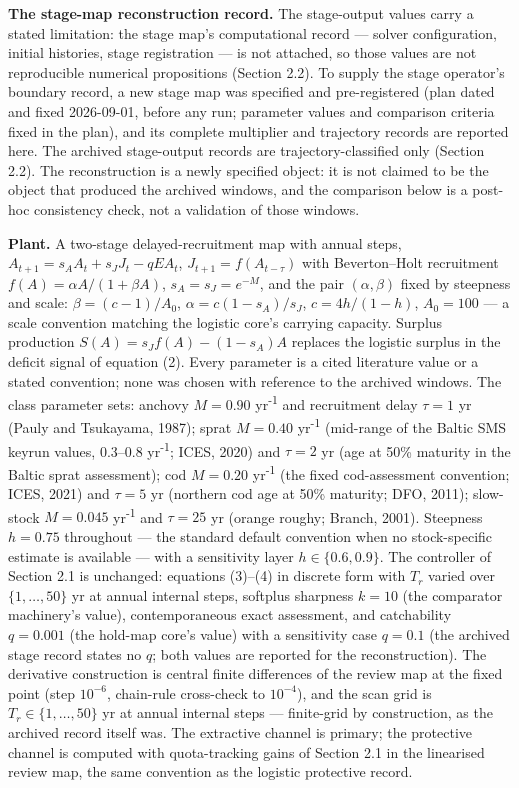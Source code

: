 \documentclass[11pt]{article}
\begin{document}
\textbf{The stage-map reconstruction record.} The stage-output values
carry a stated limitation: the stage map's computational record ---
solver configuration, initial histories, stage registration --- is not
attached, so those values are not reproducible numerical propositions
(Section 2.2). To supply the stage operator's boundary record, a new stage map was
specified and pre-registered (plan dated and fixed
2026-09-01, before any run; parameter values and comparison
criteria fixed in the plan), and its complete multiplier and trajectory
records are reported here. The archived stage-output records are trajectory-classified only (Section 2.2). The reconstruction is a newly specified object:
it is not claimed to be the object that produced the archived windows,
and the comparison below is a post-hoc consistency check, not a
validation of those windows.

\textbf{Plant.} A two-stage delayed-recruitment map with annual steps,
\(A_{t+1} = s_A A_t + s_J J_t - qE A_t\), \(J_{t+1} = f(A_{t-\tau})\)
with Beverton--Holt recruitment \(f(A) = \alpha A/(1+\beta A)\),
\(s_A = s_J = e^{-M}\), and the pair \((\alpha, \beta)\) fixed by
steepness and scale: \(\beta = (c-1)/A_0\), \(\alpha = c(1-s_A)/s_J\),
\(c = 4h/(1-h)\), \(A_0 = 100\) --- a scale convention matching
the logistic core's carrying capacity. Surplus production
\(S(A) = s_J f(A) - (1-s_A)A\) replaces the logistic surplus in the
deficit signal of equation (2). Every parameter is a cited literature
value or a stated convention; none was chosen with reference to the
archived windows. The class parameter sets: anchovy \(M = 0.90\) yr\textsuperscript{-1}
and recruitment delay \(\tau = 1\) yr (Pauly and Tsukayama, 1987); sprat
\(M = 0.40\) yr\textsuperscript{-1} (mid-range of the Baltic SMS keyrun values, 0.3--0.8
yr\textsuperscript{-1}; ICES, 2020) and \(\tau = 2\) yr (age at 50\% maturity in the
Baltic sprat assessment); cod \(M = 0.20\) yr\textsuperscript{-1} (the fixed
cod-assessment convention; ICES, 2021) and \(\tau = 5\) yr (northern cod
age at 50\% maturity; DFO, 2011); slow-stock \(M = 0.045\) yr\textsuperscript{-1} and
\(\tau = 25\) yr (orange roughy; Branch, 2001). Steepness \(h = 0.75\)
throughout --- the standard default convention when no stock-specific
estimate is available --- with a sensitivity layer
\(h \in \{0.6, 0.9\}\). The controller of Section 2.1 is unchanged: equations (3)--(4) in discrete form with \(T_r\) varied over \(\{1,\ldots,50\}\) yr at annual internal steps, softplus
sharpness \(k = 10\) (the comparator machinery's value), contemporaneous
exact assessment, and catchability \(q = 0.001\) (the hold-map core's
value) with a sensitivity case \(q = 0.1\) (the archived stage
record states no \(q\); both values are reported for the
reconstruction). The derivative construction is central finite
differences of the review map at the fixed point (step \(10^{-6}\),
chain-rule cross-check to \(10^{-4}\)), and the scan grid is
\(T_r \in \{1,\ldots,50\}\) yr at annual internal steps --- finite-grid
by construction, as the archived record itself was. The extractive
channel is primary; the protective channel is computed with
quota-tracking gains of Section 2.1 in the linearised review map, the same
convention as the logistic protective record.
\end{document}
